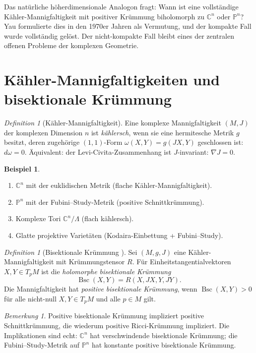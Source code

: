 \documentclass[12pt,a4paper]{amsart}
\theoremstyle{definition}
\newtheorem{example}[theorem]{Beispiel}
\theoremstyle{remark}
\newtheorem{bemerkung}[theorem]{Bemerkung}
\newtheorem{definition_de}[theorem]{Definition}
\DeclareMathOperator{\Bsc}{Bsc}
\newcommand{\CC}{\mathbb{C}}
\newcommand{\PP}{\mathbb{P}}
\begin{document}
Das natürliche höherdimensionale Analogon fragt: Wann ist eine vollständige
Kähler-Mannigfaltigkeit mit positiver Krümmung biholomorph zu $\CC^n$ oder
$\PP^n$?  Yau formulierte dies in den 1970er Jahren als Vermutung,
und der kompakte Fall wurde vollständig gelöst.  Der nicht-kompakte Fall
bleibt eines der zentralen offenen Probleme der komplexen Geometrie.

\section{Kähler-Mannigfaltigkeiten und bisektionale Krümmung}

\begin{definition_de}[Kähler-Mannigfaltigkeit]
Eine komplexe Mannigfaltigkeit $(M, J)$ der komplexen Dimension $n$ ist
\emph{kählersch}, wenn sie eine hermitesche Metrik $g$ besitzt, deren
zugehörige $(1,1)$-Form $\omega(X,Y) = g(JX, Y)$ geschlossen ist:
$d\omega = 0$.  Äquivalent: der Levi-Civita-Zusammenhang ist $J$-invariant:
$\nabla J = 0$.
\end{definition_de}

\begin{example}
\begin{enumerate}[label=(\roman*)]
  \item $\CC^n$ mit der euklidischen Metrik (flache Kähler-Mannigfaltigkeit).
  \item $\PP^n$ mit der Fubini--Study-Metrik (positive Schnittkrümmung).
  \item Komplexe Tori $\CC^n/\Lambda$ (flach kählersch).
  \item Glatte projektive Varietäten (Kodaira-Einbettung + Fubini--Study).
\end{enumerate}
\end{example}

\begin{definition_de}[Bisektionale Krümmung \cite{GoldbergKobayashi1967}]
Sei $(M, g, J)$ eine Kähler-Mannigfaltigkeit mit Krümmungstensor $R$.
Für Einheitstangentialvektoren $X, Y \in T_p M$ ist die
\emph{holomorphe bisektionale Krümmung}
\[
  \Bsc(X,Y) = R(X, JX, Y, JY).
\]
Die Mannigfaltigkeit hat \emph{positive bisektionale Krümmung}, wenn
$\Bsc(X,Y) > 0$ für alle nicht-null $X, Y \in T_p M$ und alle $p \in M$ gilt.
\end{definition_de}

\begin{bemerkung}
Positive bisektionale Krümmung impliziert positive Schnittkrümmung,
die wiederum positive Ricci-Krümmung impliziert.
Die Implikationen sind echt: $\CC^n$ hat verschwindende bisektionale Krümmung;
die Fubini--Study-Metrik auf $\PP^n$ hat konstante positive bisektionale
Krümmung.
\end{bemerkung}
\end{document}
